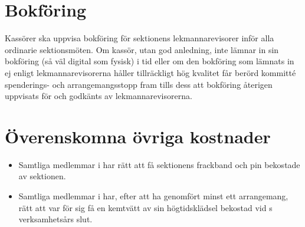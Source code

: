 \documentclass[11pt, includeaddress]{classes/cthit}
\begin{document}
\section{Bokföring}
Kassörer ska uppvisa bokföring för sektionens lekmannarevisorer inför alla ordinarie sektionsmöten. Om kassör, utan god anledning, inte lämnar in sin bokföring (så väl digital som fysisk) i tid eller om den bokföring som lämnats in ej enligt lekmannarevisorerna håller tillräckligt hög kvalitet får berörd kommitté spenderings- och arrangemangsstopp fram tills dess att bokföring återigen uppvisats för och godkänts av lekmannarevisorerna.

\section{Överenskomna övriga kostnader}
\begin{itemize}
	\item Samtliga medlemmar i \FANBARERIT{} har rätt att få sektionens frackband och pin bekostade av sektionen.
	\item Samtliga medlemmar i \FANBARERIT{} har, efter att ha genomfört minst ett arrangemang, rätt att var för sig få en kemtvätt av sin högtidsklädsel bekostad vid \FANBARERIT{}s verksamhetsårs slut.
\end{itemize}
\end{document}
